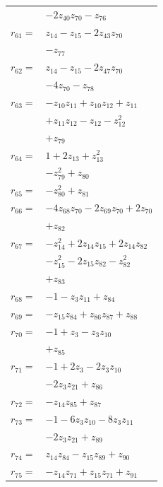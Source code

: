 \begin{longtable}{@{}r@{\;}l@{}}
 & \(\displaystyle -2z_{40}z_{70} -z_{76}\) \\[3pt]
\(r_{61}=\) & \(\displaystyle z_{14} -z_{15} -2z_{43}z_{70}\) \\
 & \(\displaystyle -z_{77}\) \\[3pt]
\(r_{62}=\) & \(\displaystyle z_{14} -z_{15} -2z_{47}z_{70}\) \\
 & \(\displaystyle -4z_{70} -z_{78}\) \\[3pt]
\(r_{63}=\) & \(\displaystyle -z_{10}z_{11} +z_{10}z_{12} +z_{11}\) \\
 & \(\displaystyle +z_{11}z_{12} -z_{12} -z_{12}^{2}\) \\
 & \(\displaystyle +z_{79}\) \\[3pt]
\(r_{64}=\) & \(\displaystyle 1 +2z_{13} +z_{13}^{2}\) \\
 & \(\displaystyle -z_{79}^{2} +z_{80}\) \\[3pt]
\(r_{65}=\) & \(\displaystyle -z_{80}^{2} +z_{81}\) \\[3pt]
\(r_{66}=\) & \(\displaystyle -4z_{68}z_{70} -2z_{69}z_{70} +2z_{70}\) \\
 & \(\displaystyle +z_{82}\) \\[3pt]
\(r_{67}=\) & \(\displaystyle -z_{14}^{2} +2z_{14}z_{15} +2z_{14}z_{82}\) \\
 & \(\displaystyle -z_{15}^{2} -2z_{15}z_{82} -z_{82}^{2}\) \\
 & \(\displaystyle +z_{83}\) \\[3pt]
\(r_{68}=\) & \(\displaystyle -1 -z_{3}z_{11} +z_{84}\) \\[3pt]
\(r_{69}=\) & \(\displaystyle -z_{15}z_{84} +z_{86}z_{87} +z_{88}\) \\[3pt]
\(r_{70}=\) & \(\displaystyle -1 +z_{3} -z_{3}z_{10}\) \\
 & \(\displaystyle +z_{85}\) \\[3pt]
\(r_{71}=\) & \(\displaystyle -1 +2z_{3} -2z_{3}z_{10}\) \\
 & \(\displaystyle -2z_{3}z_{21} +z_{86}\) \\[3pt]
\(r_{72}=\) & \(\displaystyle -z_{14}z_{85} +z_{87}\) \\[3pt]
\(r_{73}=\) & \(\displaystyle -1 -6z_{3}z_{10} -8z_{3}z_{11}\) \\
 & \(\displaystyle -2z_{3}z_{21} +z_{89}\) \\[3pt]
\(r_{74}=\) & \(\displaystyle z_{14}z_{84} -z_{15}z_{89} +z_{90}\) \\[3pt]
\(r_{75}=\) & \(\displaystyle -z_{14}z_{71} +z_{15}z_{71} +z_{91}\) \\[3pt]

\end{longtable}

